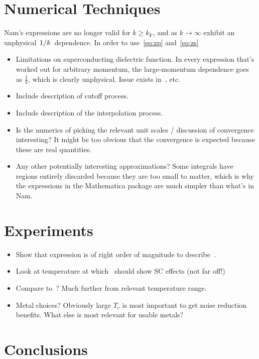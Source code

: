 \documentclass{article}
\begin{document}
\section{Numerical Techniques \label{sec:technical}}

	Nam's expressions are no longer valid for $k \geq k_\mathrm{F}$, and as $k \rightarrow \infty$ exhibit an unphysical $\flatfrac{1}{k}$ dependence.
	In order to use~\eqref{eq:zp} and~\eqref{eq:zs}
\begin{itemize}
	\item Limitations on superconducting dielectric function.
	In every expression that's worked out for arbitrary momentum, the large-momentum dependence goes as $\frac{1}{k}$, which is clearly unphysical.
	Issue exists in~\cite{Nam1967, AGD, Tinkham}, etc.
	\item Include description of cutoff process.
	\item Include description of the interpolation process.
	\item Is the numerics of picking the relevant unit scales / discussion of convergence interesting?
	It might be too obvious that the convergence is expected because these are real quantities.
	\item Any other potentially interesting approximations?
	Some integrals have regions entirely discarded because they are too small to matter, which is why the expressions in the Mathematica package are much simpler than what's in Nam.
\end{itemize}

\section{Experiments \label{sec:experiments}}
\begin{itemize}
	\item Show that expression is of right order of magnitude to describe~\cite{Tenberg2019}.
	\item Look at temperature at which~\cite{Tenberg2019} should show SC effects (not far off!)
	\item Compare to~\cite{Kolkowitz2015}?
	Much further from relevant temperature range.
	\item Metal choices?
	Obviously large $T_c$ is most important to get noise reduction benefits.
	What else is most relevant for usable metals?
\end{itemize}
\section{Conclusions \label{sec:conclusions}}

\printbibliography
\end{document}
